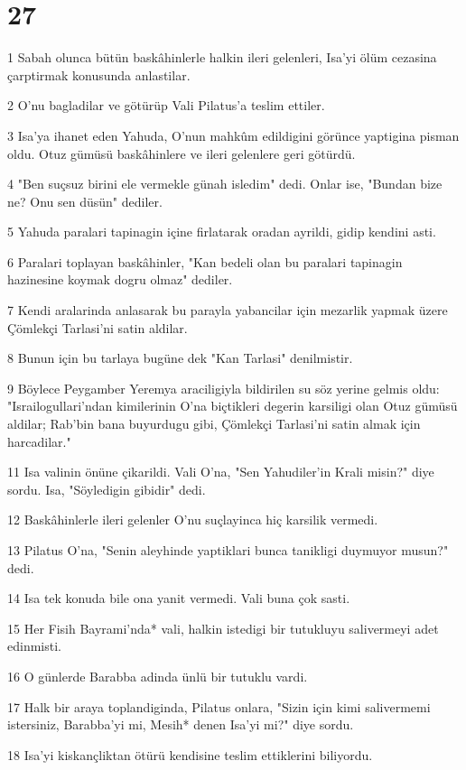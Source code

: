 \chapter{27}

\par 1 Sabah olunca bütün baskâhinlerle halkin ileri gelenleri, Isa'yi ölüm cezasina çarptirmak konusunda anlastilar.
\par 2 O'nu bagladilar ve götürüp Vali Pilatus'a teslim ettiler.
\par 3 Isa'ya ihanet eden Yahuda, O'nun mahkûm edildigini görünce yaptigina pisman oldu. Otuz gümüsü baskâhinlere ve ileri gelenlere geri götürdü.
\par 4 "Ben suçsuz birini ele vermekle günah isledim" dedi. Onlar ise, "Bundan bize ne? Onu sen düsün" dediler.
\par 5 Yahuda paralari tapinagin içine firlatarak oradan ayrildi, gidip kendini asti.
\par 6 Paralari toplayan baskâhinler, "Kan bedeli olan bu paralari tapinagin hazinesine koymak dogru olmaz" dediler.
\par 7 Kendi aralarinda anlasarak bu parayla yabancilar için mezarlik yapmak üzere Çömlekçi Tarlasi'ni satin aldilar.
\par 8 Bunun için bu tarlaya bugüne dek "Kan Tarlasi" denilmistir.
\par 9 Böylece Peygamber Yeremya araciligiyla bildirilen su söz yerine gelmis oldu: "Israilogullari'ndan kimilerinin O'na biçtikleri degerin karsiligi olan Otuz gümüsü aldilar; Rab'bin bana buyurdugu gibi, Çömlekçi Tarlasi'ni satin almak için harcadilar."
\par 11 Isa valinin önüne çikarildi. Vali O'na, "Sen Yahudiler'in Krali misin?" diye sordu. Isa, "Söyledigin gibidir" dedi.
\par 12 Baskâhinlerle ileri gelenler O'nu suçlayinca hiç karsilik vermedi.
\par 13 Pilatus O'na, "Senin aleyhinde yaptiklari bunca tanikligi duymuyor musun?" dedi.
\par 14 Isa tek konuda bile ona yanit vermedi. Vali buna çok sasti.
\par 15 Her Fisih Bayrami'nda* vali, halkin istedigi bir tutukluyu salivermeyi adet edinmisti.
\par 16 O günlerde Barabba adinda ünlü bir tutuklu vardi.
\par 17 Halk bir araya toplandiginda, Pilatus onlara, "Sizin için kimi salivermemi istersiniz, Barabba'yi mi, Mesih* denen Isa'yi mi?" diye sordu.
\par 18 Isa'yi kiskançliktan ötürü kendisine teslim ettiklerini biliyordu.

